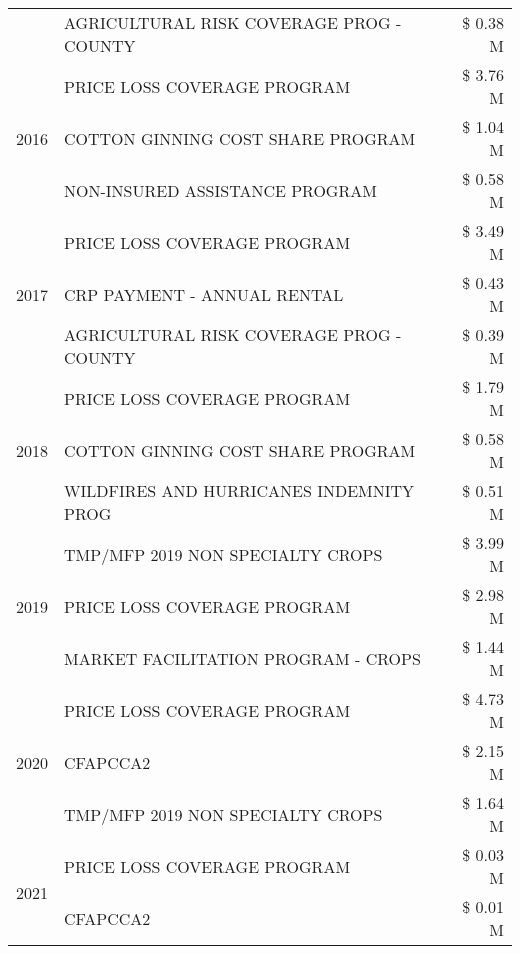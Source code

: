 \begin{tabular}{llr}
 & AGRICULTURAL RISK COVERAGE PROG - COUNTY & \$ 0.38 M \\
\cline{1-3}
\multirow[t]{3}{*}{2016} & PRICE LOSS COVERAGE PROGRAM                   & \$ 3.76 M \\
 & COTTON GINNING COST SHARE PROGRAM             & \$ 1.04 M \\
 & NON-INSURED ASSISTANCE PROGRAM                & \$ 0.58 M \\
\cline{1-3}
\multirow[t]{3}{*}{2017} & PRICE LOSS COVERAGE PROGRAM & \$ 3.49 M \\
 & CRP PAYMENT - ANNUAL RENTAL & \$ 0.43 M \\
 & AGRICULTURAL RISK COVERAGE PROG - COUNTY & \$ 0.39 M \\
\cline{1-3}
\multirow[t]{3}{*}{2018} & PRICE LOSS COVERAGE PROGRAM & \$ 1.79 M \\
 & COTTON GINNING COST SHARE PROGRAM & \$ 0.58 M \\
 & WILDFIRES AND HURRICANES INDEMNITY PROG & \$ 0.51 M \\
\cline{1-3}
\multirow[t]{3}{*}{2019} & TMP/MFP 2019 NON SPECIALTY CROPS & \$ 3.99 M \\
 & PRICE LOSS COVERAGE PROGRAM & \$ 2.98 M \\
 & MARKET FACILITATION PROGRAM - CROPS & \$ 1.44 M \\
\cline{1-3}
\multirow[t]{3}{*}{2020} & PRICE LOSS COVERAGE PROGRAM & \$ 4.73 M \\
 & CFAPCCA2 & \$ 2.15 M \\
 & TMP/MFP 2019 NON SPECIALTY CROPS & \$ 1.64 M \\
\cline{1-3}
\multirow[t]{2}{*}{2021} & PRICE LOSS COVERAGE PROGRAM & \$ 0.03 M \\
 & CFAPCCA2 & \$ 0.01 M \\
\cline{1-3}
\bottomrule
\end{tabular}

